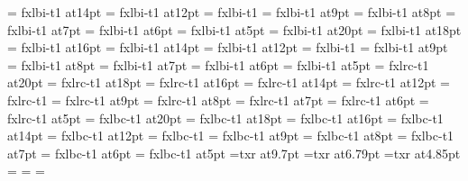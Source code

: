 \font\fourteenitbf=    fxlbi-t1 at14pt
\font\twelveitbf=      fxlbi-t1 at12pt
\font\itbf=            fxlbi-t1
\font\nineitbf=        fxlbi-t1 at9pt
\font\eightitbf=       fxlbi-t1 at8pt
\font\sevenitbf=       fxlbi-t1 at7pt
\font\sixitbf=         fxlbi-t1 at6pt
\font\fiveitbf=        fxlbi-t1 at5pt
%
\font\twentyslbf=      fxlbi-t1 at20pt
\font\eighteenslbf=    fxlbi-t1 at18pt
\font\sixteenslbf=     fxlbi-t1 at16pt
\font\fourteenslbf=    fxlbi-t1 at14pt
\font\twelveslbf=      fxlbi-t1 at12pt
\font\slbf=            fxlbi-t1
\font\nineslbf=        fxlbi-t1 at9pt
\font\eightslbf=       fxlbi-t1 at8pt
\font\sevenslbf=       fxlbi-t1 at7pt
\font\sixslbf=         fxlbi-t1 at6pt
\font\fiveslbf=        fxlbi-t1 at5pt
%
\font\twentycaps=      fxlrc-t1 at20pt
\font\eighteencaps=    fxlrc-t1 at18pt
\font\sixteencaps=     fxlrc-t1 at16pt
\font\fourteencaps=    fxlrc-t1 at14pt
\font\twelvecaps=      fxlrc-t1 at12pt
\font\caps=            fxlrc-t1
\font\ninecaps=        fxlrc-t1 at9pt
\font\eightcaps=       fxlrc-t1 at8pt
\font\sevencaps=       fxlrc-t1 at7pt
\font\sixcaps=         fxlrc-t1 at6pt
\font\fivecaps=        fxlrc-t1 at5pt
%
\font\twentycapsbf=      fxlbc-t1 at20pt
\font\eighteencapsbf=    fxlbc-t1 at18pt
\font\sixteencapsbf=     fxlbc-t1 at16pt
\font\fourteencapsbf=    fxlbc-t1 at14pt
\font\twelvecapsbf=      fxlbc-t1 at12pt
\font\capsbf=            fxlbc-t1
\font\ninecapsbf=        fxlbc-t1 at9pt
\font\eightcapsbf=       fxlbc-t1 at8pt
\font\sevencapsbf=       fxlbc-t1 at7pt
\font\sixcapsbf=         fxlbc-t1 at6pt
\font\fivecapsbf=        fxlbc-t1 at5pt
%
\font\tenmiss=txr at9.7pt
\font\sevenmiss=txr at6.79pt
\font\fivemiss=txr at4.85pt
%
\newfam\misscharfam
\textfont\misscharfam=\tenmiss
\scriptfont\misscharfam=\sevenmiss
\scriptscriptfont\misscharfam=\fivemiss
%
\def\Gamma{{\fam=\misscharfam \mathchar"7800}}%
\def\Delta{{\fam=\misscharfam \mathchar"7801}}%
\def\Theta{{\fam=\misscharfam \mathchar"7802}}%
\def\Lambda{{\fam=\misscharfam \mathchar"7803}}%
\def\Xi{{\fam=\misscharfam \mathchar"7804}}%
\def\Pi{{\fam=\misscharfam \mathchar"7805}}%
\def\Sigma{{\fam=\misscharfam \mathchar"7806}}%
\def\Upsilon{{\fam=\misscharfam \mathchar"7807}}%
\def\Phi{{\fam=\misscharfam \mathchar"7808}}%
\def\Psi{{\fam=\misscharfam \mathchar"7809}}%
\def\Omega{{\fam=\misscharfam \mathchar"780A}}%
%
\def\loadmsam{\font\tenmsa=txsya at9.7pt \font\sevenmsa=txsya at6.79pt \font\fivemsa=txsya at4.85pt \fam\msafam \textfont\msafam=\tenmsa \scriptfont\msafam=\sevenmsa \scriptscriptfont\msafam=\fivemsa \global\let\loadmsam\empty}%
\def\loadmsbm{\font\tenmsb=txsyb at9.7pt\font\sevenmsb=txsyb at6.79pt\font\fivemsb=txsyb at4.85pt \fam\msbfam \textfont\msbfam=\tenmsb \scriptfont\msbfam=\sevenmsb \scriptscriptfont\msbfam=\fivemsb \global\let\loadmsbm\empty}%
\def\UseAMSsymbols{\loadmsam\loadmsbm}%
%
%
\rm